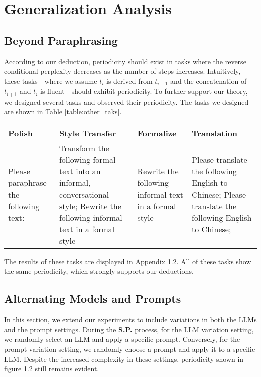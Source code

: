 \section{Generalization Analysis}

\subsection{Beyond Paraphrasing}

According to our deduction, periodicity should exist in tasks where the reverse conditional perplexity decreases as the number of steps increases. Intuitively, these tasks—where we assume \(t_i\) is derived from \(t_{i+1}\) and the concatenation of \(t_{i+1}\) and \(t_i\) is fluent—should exhibit periodicity.
To further support our theory, we designed several tasks and observed their periodicity. 
The tasks we designed are shown in Table \ref{table:other_taks}.

\begin{table*}[h!]
\centering
\begin{tabular}{|p{3cm}|p{3cm}|p{3cm}|p{3cm}|}
\hline
\textbf{Polish} & \textbf{Style Transfer} & \textbf{Formalize} & \textbf{Translation} \\ \hline
Please paraphrase the following text: & Transform the following formal text into an informal, conversational style; Rewrite the following informal text in a formal style & Rewrite the following informal text in a formal style & Please translate the following English to Chinese; Please translate the following English to Chinese;
\\ \hline
\end{tabular}
\label{table:other_taks}
\caption{Tasks}
\end{table*}

The results of these tasks are displayed in Appendix \ref{}. All of these tasks show the same periodicity, which strongly supports our deductions.



\subsection{Alternating Models and Prompts}


In this section, we extend our experiments to include variations in both the LLMs and the prompt settings.
During the \textbf{S.P.} process, for the LLM variation setting, we randomly select an LLM and apply a specific prompt. Conversely, for the prompt variation setting, we randomly choose a prompt and apply it to a specific LLM.
Despite the increased complexity in these settings, periodicity shown in figure \ref{} still remains evident.


